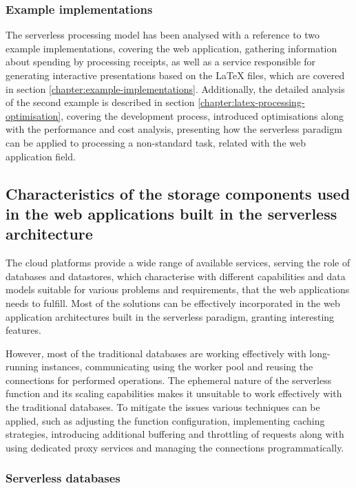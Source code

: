 \subsubsection{Example implementations}

The serverless processing model has been analysed with a reference to two example implementations, covering the web application, gathering information about spending by processing receipts, as well as a service responsible for generating interactive presentations based on the LaTeX files, which are covered in section \ref{chapter:example-implementations}.
Additionally, the detailed analysis of the second example is described in section \ref{chapter:latex-processing-optimisation}, covering the development process, introduced optimisations along with the performance and cost analysis, presenting how the serverless paradigm can be applied to processing a non-standard task, related with the web application field.

\subsection{Characteristics of the storage components used in the web applications built in the serverless architecture}

The cloud platforms provide a wide range of available services, serving the role of databases and datastores, which characterise with different capabilities and data models suitable for various problems and requirements, that the web applications needs to fulfill.
Most of the solutions can be effectively incorporated in the web application architectures built in the serverless paradigm, granting interesting features.

However, most of the traditional databases are working effectively with long-running instances, communicating using the worker pool and reusing the connections for performed operations.
The ephemeral nature of the serverless function and its scaling capabilities makes it unsuitable to work effectively with the traditional databases.
To mitigate the issues various techniques can be applied, such as adjusting the function configuration, implementing caching strategies, introducing additional buffering and throttling of requests along with using dedicated proxy services and managing the connections programmatically.

\subsubsection{Serverless databases}

